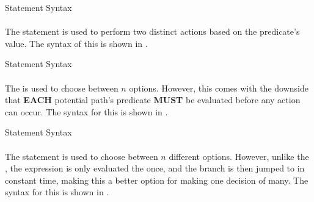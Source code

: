 \begin{listing}[h!tbp]
\caption{\texorpdfstring{}{\texttt{if}} Statement Syntax}
\label{lst:if_Statement}
\end{listing}

\paragraph{\texorpdfstring{ }{\texttt{if}-\texttt{else}}}\label{par:if_else_Statement}
The  statement is used to perform two distinct actions based on the predicate's value.
The syntax of this is shown in .

\begin{listing}[h!tbp]
\caption{\texorpdfstring{}{\texttt{if else}} Statement Syntax}
\label{lst:if_else_Statement}
\end{listing}

\paragraph{\texorpdfstring{  }{\texttt{if}-\texttt{else if}-\texttt{case}}}\label{par:if_elseif_else_Statement}
The  is used to choose between $n$ options.
However, this comes with the downside that \textbf{EACH} potential path's predicate \textbf{MUST} be evaluated before any action can occur.
The syntax for this is shown in .

\begin{listing}[h!tbp]
\caption{\texorpdfstring{}{\texttt{if else if else}} Statement Syntax}
\label{lst:if_elseif_else_Statement}
\end{listing}

\paragraph{\texorpdfstring{ }{\texttt{switch}-\texttt{case}}}\label{par:switch_case_Statement}
The  statement is used to choose between $n$ different options.
However, unlike the , the expression is only evaluated the once, and the branch is then jumped to in constant time, making this a better option for making one decision of many.
The syntax for this is shown in .

